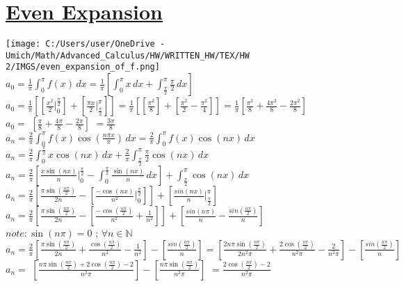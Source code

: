 \documentclass[a4paper,man,natbib]{apa6}
\newcommand{\N}{\mathbb{N}}  %
\begin{document}
\newpage
\section{\underline{Even Expansion}}
\label{sec: Even Expansion}

\begin{center}

    \texttt{[image: C:/Users/user/OneDrive - Umich/Math/Advanced\_Calculus/HW/WRITTEN\_HW/TEX/HW 2/IMGS/even\_expansion\_of\_f.png]} \\
    
    \hfill \break
    $ a_0 = \frac{1}{\pi} \int_{0}^{\pi} f(x) \,dx = \frac{1}{\pi} [\int_{0}^{\pi} x \,dx + \int_{\frac{\pi}{2}}^{\pi} \frac{\pi}{2} \,dx ] $ \\
    $ a_0 = \frac{1}{\pi} [[\frac{x^2}{2} \Big|_{0}^{\frac{\pi}{2}}] + [\frac{\pi x}{2} \Big|_{\frac{\pi}{2}}^{\pi}]] = \frac{1}{\pi} [[\frac{\pi^2}{8}] + [\frac{\pi^2}{2} - \frac{\pi^2}{4}]] 
    = \frac{1}{\pi} [\frac{\pi^2}{8} + \frac{4\pi^2}{8} - \frac{2\pi^2}{8}] $ \\
    \color{violet} $ a_0 = $ \color{black} $ [\frac{\pi}{8} + \frac{4\pi}{8} - \frac{2\pi}{8}] $ \color{violet} $ = \frac{3\pi}{8} $ \color{black} \\
    
    \hfill \break
    $ a_n = \frac{2}{\pi} \int_{0}^{\pi} f(x) \cos(\frac{n\pi x}{\pi}) \,dx  =
    \frac{2}{\pi} \int_{0}^{\pi} f(x) \cos(nx) \,dx $  \\
    $ a_n = \frac{2}{\pi} \int_{0}^{\frac{\pi}{2}} x \cos(nx) \,dx + \frac{2}{\pi} \int_{\frac{\pi}{2}}^{\pi} \frac{\pi}{2} \cos(nx) \,dx $ \\
    $ a_n = \frac{2}{\pi} [\frac{x\sin(nx)}{n} \Big|_{0}^{\frac{\pi}{2}} - \int_{0}^{\frac{\pi}{2}} \frac{\sin(nx)}{n} \,dx] + \int_{\frac{\pi}{2}}^{\pi} \cos(nx) \,dx $ \\
    $ a_n = \frac{2}{\pi} [\frac{\pi\sin(\frac{n\pi}{2})}{2n} - [\frac{-\cos(nx)}{n^2} \Big|_{0}^{\frac{\pi}{2}}]] + [\frac{sin(nx)}{n} \Big|_{\frac{\pi}{2}}^{\pi}] $ \\
    $ a_n = \frac{2}{\pi} [\frac{\pi\sin(\frac{n\pi}{2})}{2n} - [\frac{-\cos(\frac{n\pi}{2})}{n^2} + \frac{1}{n^2}]] + [\frac{sin(n\pi)}{n} - \frac{sin(\frac{n\pi}{2})}{n}] $ \\
    
    $ note: \sin(n\pi) = 0 $ ; $ \forall n \in \N $ 
    $ a_n = \frac{2}{\pi} [\frac{\pi\sin(\frac{n\pi}{2})}{2n} + \frac{\cos(\frac{n\pi}{2})}{n^2} - \frac{1}{n^2}] - [\frac{sin(\frac{n\pi}{2})}{n}] = [\frac{2n\pi\sin(\frac{n\pi}{2})}{2n^2\pi} + \frac{2\cos(\frac{n\pi}{2})}{n^2\pi}- \frac{2}{n^2\pi}] - [\frac{sin(\frac{n\pi}{2})}{n}] $ \\
    \color{blue} $ a_n = $ \color{black} $ [\frac{n\pi\sin(\frac{n\pi}{2}) + 2\cos(\frac{n\pi}{2}) - 2}{n^2\pi}] - [\frac{n\pi\sin(\frac{n\pi}{2})}{n^2\pi}] $ \color{blue} $ = \frac{2\cos(\frac{n\pi}{2}) - 2}{n^2\pi} $ \color{black} \\


\end{center}
\end{document}
